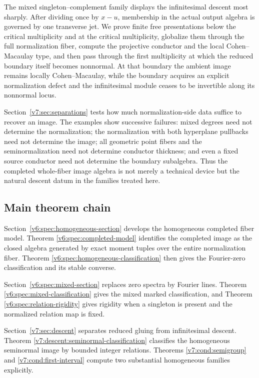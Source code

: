 \documentclass[10pt,fleqn]{article}
\numberwithin{equation}{section}
\begin{document}
The mixed singleton--complement family displays the infinitesimal descent most
sharply.  After dividing once by \(x-u\), membership in the actual output
algebra is governed by one transverse jet.  We prove finite free
presentations below the critical multiplicity and at the critical
multiplicity, globalize them through the full normalization fiber, compute the
projective conductor and the local Cohen--Macaulay type, and then pass through
the first multiplicity at which the reduced boundary itself becomes
nonnormal.  At that boundary the ambient image remains locally
Cohen--Macaulay, while the boundary acquires an explicit normalization defect
and the infinitesimal module ceases to be invertible along its nonnormal
locus.

Section~\ref{v7:sec:separations} tests how much normalization-side data
suffice to recover an image.  The examples show successive failures: mixed degrees need not
determine the normalization; the normalization with both hyperplane pullbacks
need not determine the image; all geometric point fibers and the
seminormalization need not determine conductor thickness; and even a fixed
source conductor need not determine the boundary subalgebra.  Thus the
completed whole-fiber image algebra is not merely a technical device but the
natural descent datum in the families treated here.

\subsection{Main theorem chain}

Section~\ref{v6:spec:homogeneous-section} develops the homogeneous completed
fiber model.  Theorem \ref{v6:spec:completed-model} identifies the completed
image as the closed algebra generated by exact moment tuples over the entire
normalization fiber.  Theorem \ref{v6:spec:homogeneous-classification} then
gives the Fourier-zero classification and its stable converse.

Section~\ref{v6:spec:mixed-section} replaces zero spectra by Fourier lines.
Theorem \ref{v6:spec:mixed-classification} gives the mixed marked
classification, and Theorem \ref{v6:spec:relation-rigidity} gives rigidity
when a singleton is present and the normalized relation map is fixed.

Section~\ref{v7:sec:descent} separates reduced gluing from infinitesimal
descent.  Theorem \ref{v7:descent:seminormal-classification} classifies the homogeneous
seminormal image by bounded integer relations.  Theorems \ref{v7:cond:semigroup}
and \ref{v7:cond:first-interval} compute two substantial homogeneous
families explicitly.
\end{document}
